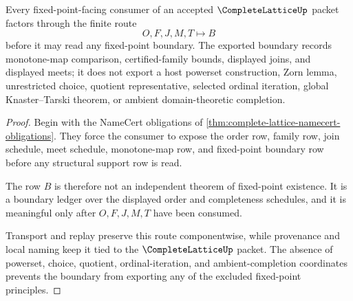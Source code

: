 \begin{theorem}
\label{thm:complete-lattice-monotone-fixed-point-boundary}
Every fixed-point-facing consumer of an accepted $\CompleteLatticeUp$ packet factors through the finite route
$$
O,F,J,M,T \longmapsto B
$$
before it may read any fixed-point boundary. The exported boundary records monotone-map comparison, certified-family bounds, displayed joins, and displayed meets; it does not export a host powerset construction, Zorn lemma, unrestricted choice, quotient representative, selected ordinal iteration, global Knaster--Tarski theorem, or ambient domain-theoretic completion.
\end{theorem}
\begin{proof}
Begin with the NameCert obligations of \autoref{thm:complete-lattice-namecert-obligations}. They force the consumer to expose the order row, family row, join schedule, meet schedule, monotone-map row, and fixed-point boundary row before any structural support row is read.

The row $B$ is therefore not an independent theorem of fixed-point existence. It is a boundary ledger over the displayed order and completeness schedules, and it is meaningful only after $O,F,J,M,T$ have been consumed.

Transport and replay preserve this route componentwise, while provenance and local naming keep it tied to the $\CompleteLatticeUp$ packet. The absence of powerset, choice, quotient, ordinal-iteration, and ambient-completion coordinates prevents the boundary from exporting any of the excluded fixed-point principles.
\end{proof}


\begin{closurestatus}{\CompleteLatticeUp}
  \theoryclosure{\seedClosure}
  \formalstatus{\unformalizedV}
\end{closurestatus}

